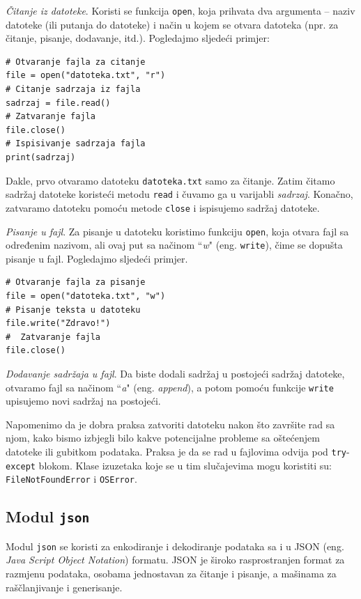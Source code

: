 \textit{Čitanje iz datoteke}. Koristi se funkcija \texttt{open}, koja prihvata dva argu\-menta -- naziv datoteke (ili putanja do datoteke) i način u kojem se otvara datoteka (npr. za čitanje, pisanje, dodavanje, itd.). Pogledajmo sljedeći primjer: 
\begin{verbatim}
# Otvaranje fajla za citanje
file = open("datoteka.txt", "r")
# Citanje sadrzaja iz fajla 
sadrzaj = file.read()
# Zatvaranje fajla
file.close()
# Ispisivanje sadrzaja fajla 
print(sadrzaj)
\end{verbatim}

Dakle, prvo otvaramo datoteku  \texttt{datoteka.txt} samo za čitanje. Zatim čitamo sadržaj datoteke koristeći metodu \texttt{read} i čuvamo ga u varijabli \textit{sadrzaj}. Konačno, zatvaramo datoteku pomoću metode \texttt{close} i ispisujemo sadržaj datoteke. 



\textit{Pisanje u fajl}. Za pisanje u datoteku koristimo funkciju \texttt{open}, koja otvara fajl sa određenim nazivom, ali ovaj put sa načinom ``\textit{w}" (eng. \texttt{write}), čime se dopušta pisanje u fajl. Pogledajmo sljedeći primjer.
\begin{verbatim}
# Otvaranje fajla za pisanje
file = open("datoteka.txt", "w")
# Pisanje teksta u datoteku
file.write("Zdravo!")
#  Zatvaranje fajla 
file.close()
\end{verbatim}


\textit{Dodavanje sadržaja u fajl}. Da biste dodali sadržaj u postojeći sadržaj datoteke, otvaramo fajl sa načinom ``\textit{a}" (eng. \textit{append}), a potom pomoću funkcije \texttt{write} upisujemo novi sadržaj na postojeći. 

Napomenimo da je dobra praksa zatvoriti datoteku nakon što zavr\-šite rad sa njom, kako bismo izbjegli bilo kakve potencijalne probleme sa oštećenjem datoteke ili gubitkom podataka. Praksa je da se rad u fajlovima odvija pod \texttt{try}-\texttt{except} blokom. Klase izuzetaka koje se u tim slučajevima mogu koristiti su: \texttt{FileNotFoundError} i \texttt{OSError}. 


\subsection{Modul \texttt{json}}

Modul \texttt{json} se koristi  za enkodiranje i dekodiranje podataka sa i u JSON (eng. \textit{Java Script Object Notation}) formatu. JSON je  široko raspro\-stranjen format za razmjenu podataka, osobama  jednostavan za čitanje i pisanje, a mašinama za raščlanjivanje i generisanje.\\

